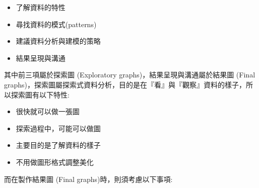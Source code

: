 \documentclass[
]{book}
\providecommand{\tightlist}{%
  \setlength{\itemsep}{0pt}\setlength{\parskip}{0pt}}
\begin{document}
\begin{itemize}
\tightlist
\item
  了解資料的特性
\item
  尋找資料的模式(patterns)
\item
  建議資料分析與建模的策略
\item
  結果呈現與溝通
\end{itemize}

其中前三項屬於探索圖 (Exploratory graphs)，結果呈現與溝通屬於結果圖 (Final graphs)，探索圖屬探索式資料分析，目的是在『看』與『觀察』資料的樣子，所以探索圖有以下特性:

\begin{itemize}
\tightlist
\item
  很快就可以做一張圖
\item
  探索過程中，可能可以做圖
\item
  主要目的是了解資料的樣子
\item
  不用做圖形格式調整美化
\end{itemize}

而在製作結果圖 (Final graphs)時，則須考慮以下事項:
\end{document}
